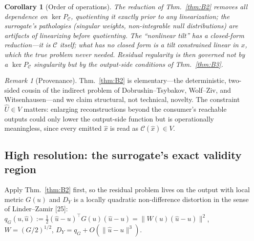 \documentclass[lettersize,onecolumn]{IEEEtran}
\newtheorem{corollary}{Corollary}
\theoremstyle{definition}
\theoremstyle{remark}
\newtheorem*{remark}{Remark}
\newcommand{\PC}{P_{\mathcal{C}}}
\begin{document}
\begin{corollary}[Order of operations]\label{cor:B2b}
The reduction of Thm.~\ref{thm:B2} removes all dependence on $\ker\PC$, quotienting it
\emph{exactly} prior to any linearization; the surrogate's pathologies (singular
weights, non-integrable null distributions) are artifacts of linearizing before
quotienting. The ``nonlinear tilt'' has a closed-form \emph{reduction}---it is
$\mathcal{C}$ itself; what has no closed form is a tilt constrained linear in $x$,
which the true problem never needed. Residual regularity is then governed not by a
$\ker\PC$ singularity but by the output-side conditions of Thm.~\ref{thm:B3}.
\end{corollary}

\begin{remark}[Provenance]
Thm.~\ref{thm:B2} is elementary---the deterministic, two-sided cousin of the indirect
problem of Dobrushin--Tsybakov, Wolf--Ziv, and Witsenhausen---and we claim structural,
not technical, novelty. The constraint $\hat U\in V$ matters: enlarging reconstructions
beyond the consumer's reachable outputs could only lower the output-side function but
is operationally meaningless, since every emitted $\hat x$ is read as
$\mathcal{C}(\hat x)\in V$.
\end{remark}

\subsection{High resolution: the surrogate's exact validity region}

Apply Thm.~\ref{thm:B2} first, so the residual problem lives on the output with local
metric $G(u)$ and $D_Y$ is a locally quadratic non-difference distortion in the sense
of Linder--Zamir [25]: $q_G(u,\hat u):=\tfrac12(\hat u-u)^\top
G(u)(\hat u-u)=\|W(u)(\hat u-u)\|^2$, $W=(G/2)^{1/2}$, $D_Y=q_G+O(\|\hat u-u\|^3)$.
\end{document}
